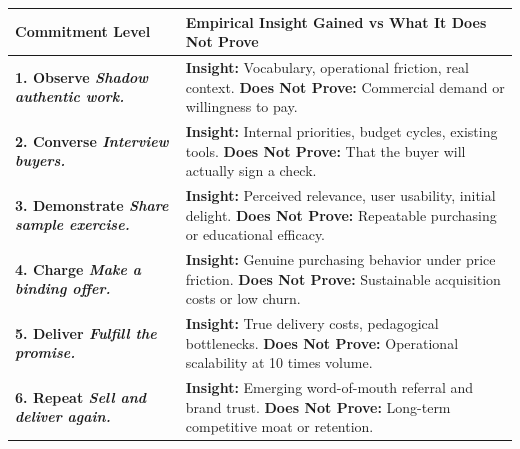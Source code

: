 \begin{table}[htbp]
\centering
\begin{tcolorbox}[
  enhanced,
  colback=white,
  colframe=BayesBorder!80!white,
  boxrule=0.4pt,
  arc=2pt,
  left=3pt,right=3pt,top=3pt,bottom=3pt,
  before skip=3pt,after skip=4pt
]
\scriptsize
\setlength{\tabcolsep}{3pt}
\renewcommand{\arraystretch}{1.18}
\begin{tabularx}{\linewidth}{@{} >{\bfseries\color{BayesInk}}p{2.3cm} >{\color{BayesInk}}X @{}}
\toprule
\textbf{Commitment Level} & \textbf{Empirical Insight Gained vs What It Does Not Prove} \\
\midrule
1. Observe\newline
\textit{Shadow authentic work.} & 
\textbf{Insight:} Vocabulary, operational friction, real context.\newline
\textbf{Does Not Prove:} Commercial demand or willingness to pay. \\
\midrule
2. Converse\newline
\textit{Interview buyers.} & 
\textbf{Insight:} Internal priorities, budget cycles, existing tools.\newline
\textbf{Does Not Prove:} That the buyer will actually sign a check. \\
\midrule
3. Demonstrate\newline
\textit{Share sample exercise.} & 
\textbf{Insight:} Perceived relevance, user usability, initial delight.\newline
\textbf{Does Not Prove:} Repeatable purchasing or educational efficacy. \\
\midrule
4. Charge\newline
\textit{Make a binding offer.} & 
\textbf{Insight:} Genuine purchasing behavior under price friction.\newline
\textbf{Does Not Prove:} Sustainable acquisition costs or low churn. \\
\midrule
5. Deliver\newline
\textit{Fulfill the promise.} & 
\textbf{Insight:} True delivery costs, pedagogical bottlenecks.\newline
\textbf{Does Not Prove:} Operational scalability at 10 times volume. \\
\midrule
6. Repeat\newline
\textit{Sell and deliver again.} & 
\textbf{Insight:} Emerging word-of-mouth referral and brand trust.\newline
\textbf{Does Not Prove:} Long-term competitive moat or retention. \\

\end{tabularx}
\end{tcolorbox}
\end{table}
